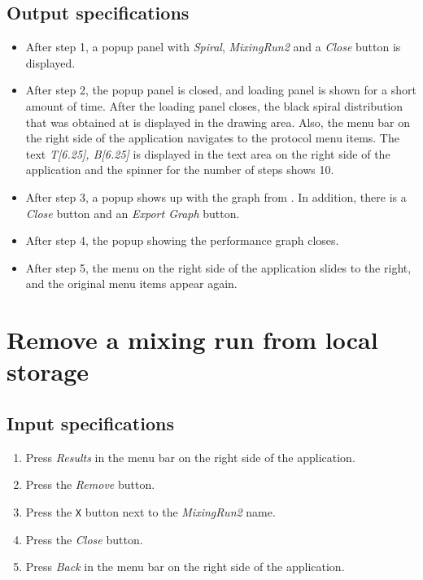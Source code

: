 \subsection*{Output specifications}
\begin{itemize}
\item After step 1, a popup panel with \emph{Spiral}, \emph{MixingRun2} and a \emph{Close} button is displayed.
\item After step 2, the popup panel is closed, and loading panel is shown for a short amount of time. After the loading panel closes, the black spiral distribution that was obtained at  is displayed in the drawing area. Also, the menu bar on the right side of the application navigates to the protocol menu items. The text \emph{T[6.25], B[6.25]} is displayed in the text area on the right side of the application and the spinner for the number of steps shows 10.
\item After step 3, a popup shows up with the graph from . In addition, there is a \emph{Close} button and an \emph{Export Graph} button.
\item After step 4, the popup showing the performance graph closes.
\item After step 5, the menu on the right side of the application slides to the right, and the original menu items appear again.
\end{itemize}

\section{Remove a mixing run from local storage}

\subsection*{Input specifications}
\begin{enumerate}
\item Press \emph{Results} in the menu bar on the right side of the application.
\item Press the \emph{Remove} button.
\item Press the \texttt{X} button next to the \emph{MixingRun2} name.
\item Press the \emph{Close} button.
\item Press \emph{Back} in the menu bar on the right side of the application.
\end{enumerate}

